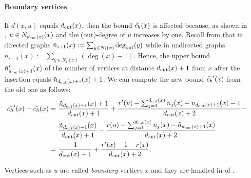 \paragraph{Boundary vertices}
%
If $d(x, u)$ equals $d_{\text{cut}}(x)$, then the bound $\widetilde{c_h}(x)$ is affected because,
as shown in , $u \in N_{d_{\text{cut}}(x)}(x)$ and
the (out)-degree of $u$ increases by one. Recall from  that in
directed graphs $\tilde{n}_{i + 1}(x) := \sum_{y \in N_i(x)}\deg_{\text{out}}(y)$ while in
undirected graphs $\tilde{n}_{i + 1}(x) := \sum_{y \in N_i(x)}(\deg(x) - 1)$.
Hence, the upper bound $\tilde{n}_{d_{\text{cut}}(x) + 1}'(x)$ of the number of
vertices at distance $d_{\text{cut}}(x) + 1$ from $x$ after the insertion equals
$\tilde{n}_{d_{\text{cut}}(x) + 1}(x) + 1$.
We can compute the new bound $\widetilde{c_h}'(x)$ from the old one as follows:
%
\begin{align*}
\widetilde{c_h}'(x) - \widetilde{c_h}(x)
=\ &\frac{\tilde{n}_{d_{\text{cut}}(x) + 1}(x) + 1}{d_{\text{cut}}(x) + 1} +
\frac{r'(u) - \sum_{j = 1}^{d_{\text{cut}}(x)}n_j(x) - \tilde{n}_{d_{\text{cut}}(x) + 1}(x) - 1}{d_{\text{cut}}(x) + 2} - \\
&\frac{\tilde{n}_{d_{\text{cut}}(x) + 1}(x)}{d_{\text{cut}}(x) + 1} -
\frac{r(u) - \sum_{j = 1}^{d_{\text{cut}}(x)}n_j(x) - \tilde{n}_{d_{\text{cut}}(x) + 1}(x)}{d_{\text{cut}}(x) + 2}\\
=\ &\frac{1}{d_{\text{cut}}(x) + 1} + \frac{r'(x) - 1 - r(x)}{d_{\text{cut}}(x) + 2}.
\end{align*}

Vertices such as $u$ are called \emph{boundary} vertices \wrt $x$ and they are
handled in  of .

